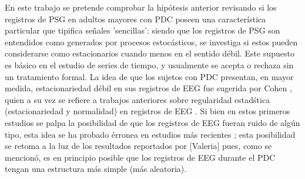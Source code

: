\documentclass[12pt,a4paper]{mitthesis}
\begin{document}
En este trabajo se pretende comprobar la hip\'otesis anterior revisando si los registros de PSG en 
adultos mayores con PDC poseen una caracter\'istica particular que tipifica se\~nales 'sencillas': 
siendo que los registros de PSG son entendidos como generados por procesos estoc\'asticos, se 
investiga si estos pueden considerarse como estacionarios cuando menos en el sentido d\'ebil.
Este supuesto es b\'asico en el estudio de series de tiempo, y usualmente se acepta o rechaza sin 
un tratamiento formal.
La idea de que los sujetos con PDC presentan, en mayor medida, estacionariedad d\'ebil en sus 
registros de EEG fue sugerida por Cohen \cite{Cohen77}, quien a su vez se refiere a trabajos 
anteriores sobre regularidad estad\'stica (estacionariedad y normalidad) en registros de EEG \cite{McEwen75,Sugimoto78,Kawabata73}. 
Si bien en estos primeros estudios se palpa la posibilidad de que los registros de EEG fueran
ruido de alg\'un tipo, esta idea se ha probado \'erronea en estudios m\'as recientes 
\cite{Klonowski09}; esta posibilidad se retoma a la luz de los resultados reportados por
[Valeria] pues, como se mencion\'o, es en principio posible que los registros de EEG durante el 
PDC tengan una estructura m\'as simple (m\'as aleatoria).

\end{document}
